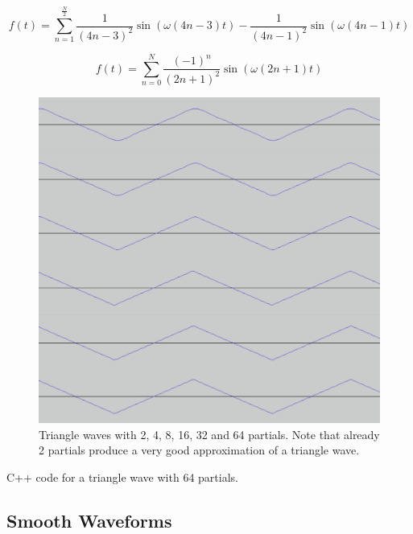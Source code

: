 \begin{equation}
  f(t) = \sum\limits_{n=1}^\frac{N}{2} \frac{1}{(4n-3)^2}\sin(\omega (4n-3) t) - \frac{1}{(4n-1)^2}\sin(\omega (4n-1) t)
  \label{eq:atri1}
\end{equation}

\begin{equation}
  f(t) = \sum\limits_{n=0}^N \frac{(-1)^n}{(2n+1)^2} \sin(\omega (2n + 1) t)
  \label{eq:atri2}
\end{equation}

\begin{figure}
  \includegraphics[scale=0.2]{img/tri}
  \caption{Triangle waves with 2, 4, 8, 16, 32 and 64 partials. Note that already 2 partials produce a very good approximation of a triangle wave.}
  \label{fig:tri}
\end{figure}

\begin{table}
  \caption{C++ code for a triangle wave with 64 partials.}
  \label{code:atri}
\end{table}

\pagebreak

\subsection{Smooth Waveforms}

